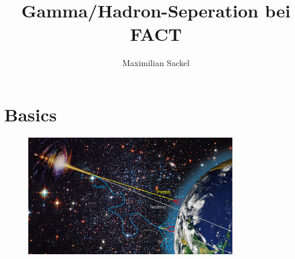 \documentclass[aspectratio=1610, professionalfonts, 9pt]{beamer}
\title{Gamma/Hadron-Seperation bei FACT}
\author[M.~Sackel]{Maximilian Sackel}
\institute[Experimental Physics 5]{Experimental Physiks 5b \\  Astroteilchenphysik}
\begin{document}
\maketitle

\section{Basics}
\begin{frame}
  \begin{figure}
	\centering
	\includegraphics[width=0.8\textwidth]{./images/sources-detection.jpg} \\
	\caption{\cite{Overview}}
  \end{figure}
\end{frame}
\end{document}
